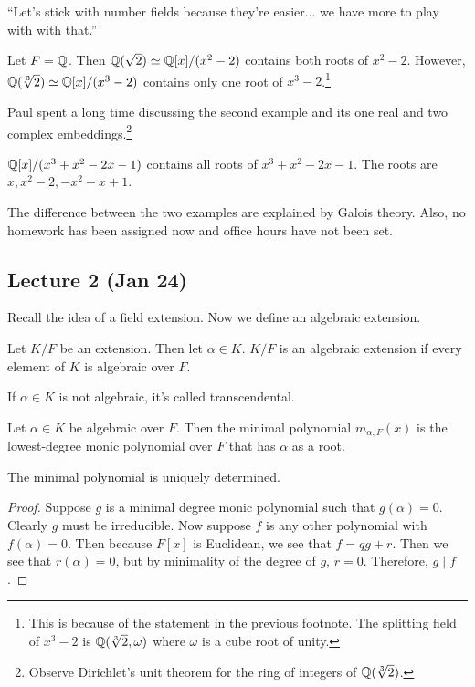 \documentclass[10pt, twoside]{article}
\begin{document}
    ``Let's stick with number fields because they're easier... we have more to play with with that.''

    \begin{exm}
        Let $F = \mathbb{Q}$. Then $\mathbb{Q}(\sqrt{2}) \simeq \mathbb{Q}[x]/(x^2-2)$ contains both roots of $x^2-2$. However, $\mathbb{Q}(\sqrt[3]{2}) \simeq \mathbb{Q}[x]/(x^3-2)$ contains only one root of $x^3-2$.\footnote{This is because of the statement in the previous footnote. The splitting field of $x^3-2$ is $\mathbb{Q}(\sqrt[3]{2}, \omega)$ where $\omega$ is a cube root of unity.}
    \end{exm}

    Paul spent a long time discussing the second example and its one real and two complex embeddings.\footnote{Observe Dirichlet's unit theorem for the ring of integers of $\mathbb{Q}(\sqrt[3]{2})$.}

    \begin{exm}
        $\mathbb{Q}[x]/(x^3+x^2-2x-1)$ contains all roots of $x^3+x^2-2x-1$. The roots are $x, x^2-2, -x^2-x+1$.
    \end{exm}

    The difference between the two examples are explained by Galois theory. Also, no homework has been assigned now and office hours have not been set.

    \subsection{Lecture 2 (Jan 24)}%
    Recall the idea of a field extension. Now we define an algebraic extension.

    \begin{defn}
        Let $K/F$ be an extension. Then let $\alpha \in K$. $K/F$ is an algebraic extension if every element of $K$ is algebraic over $F$.
    \end{defn}

    If $\alpha \in K$ is not algebraic, it's called transcendental.

    \begin{defn}
        Let $\alpha \in K$ be algebraic over $F$. Then the minimal polynomial $m_{\alpha,F}(x)$ is the lowest-degree monic polynomial over $F$ that has $\alpha$ as a root.
    \end{defn}

    \begin{prop}
        The minimal polynomial is uniquely determined.
        \begin{proof}
            Suppose $g$ is a minimal degree monic polynomial such that $g(\alpha) = 0$. Clearly $g$ must be irreducible. Now suppose $f$ is any other polynomial with $f(\alpha) = 0$. Then because $F[x]$ is Euclidean, we see that $f = qg+r$. Then we see that $r(\alpha) = 0$, but by minimality of the degree of $g$, $r=0$. Therefore, $g \mid f$.
        \end{proof}
    \end{prop}
\end{document}
